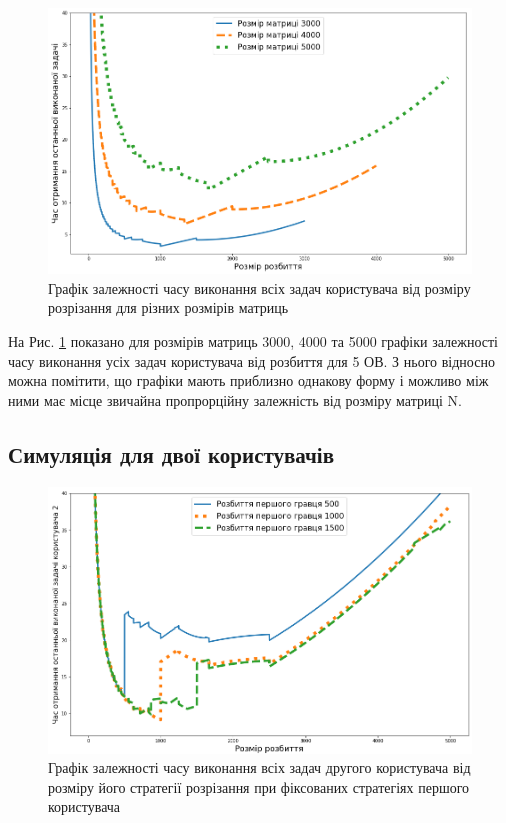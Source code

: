 \begin{figure}[H]
	\centering
	\includegraphics[width=\textwidth]{practice/img/one_user_different_N}
	\caption{Графік залежності часу виконання всіх задач користувача від розміру розрізання для різних розмірів матриць}
	\label{fig:one_diff_N}
\end{figure}

На Рис. \ref{fig:one_diff_N} показано для розмірів матриць 3000, 4000 та 5000 графіки залежності часу виконання усіх задач користувача від розбиття для 5 ОВ. З нього відносно можна помітити, що графіки мають приблизно однакову форму і можливо між ними має місце звичайна пропрорційну залежність від розміру матриці N.

\subsection{Симуляція для двої користувачів}

\begin{figure}[H]
	\centering
	\includegraphics[width=\textwidth]{practice/img/two_users_fixed_first}
	\caption{Графік залежності часу виконання всіх задач другого користувача від розміру його стратегії розрізання при фіксованих стратегіях першого користувача}
	\label{fig:two_users_fixed_first}
\end{figure}

